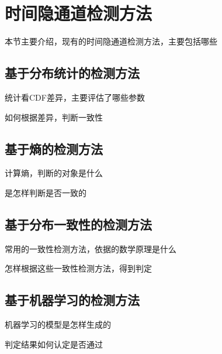 \section{时间隐通道检测方法}
\label{chap:backinfo:detect}

本节主要介绍，现有的时间隐通道检测方法，主要包括哪些

\subsection{基于分布统计的检测方法}
\label{chap:backinfo:detect：statistical}

统计看CDF差异，主要评估了哪些参数

如何根据差异，判断一致性

\subsection{基于熵的检测方法}
\label{chap:backinfo:detect:entropy}

计算熵，判断的对象是什么

是怎样判断是否一致的

\subsection{基于分布一致性的检测方法}
\label{chap:backinfo:detect:distribution}

常用的一致性检测方法，依据的数学原理是什么

怎样根据这些一致性检测方法，得到判定

\subsection{基于机器学习的检测方法}
\label{chap:backinfo:detect:machine}

机器学习的模型是怎样生成的

判定结果如何认定是否通过